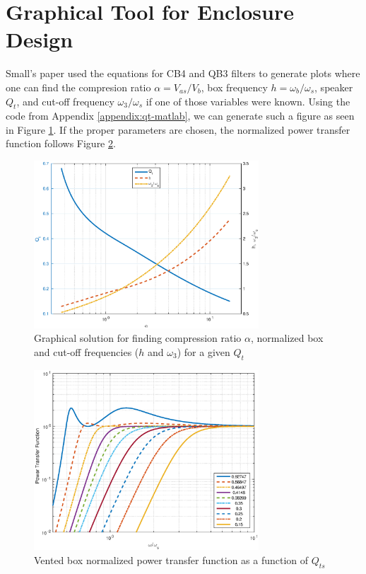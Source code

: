 \documentclass[10pt]{book}
\begin{document}
\section{Graphical Tool for Enclosure Design} Small's paper used the equations for CB4 and QB3 filters to generate plots where one can find the compresion ratio $\alpha=V_{as}/V_{b}$, box frequency $h=\omega_b/\omega_s$, speaker $Q_t$, and cut-off frequency $\omega_3/\omega_s$ if one of those variables were known. Using the code from Appendix \ref{appendix:qt-matlab}, we can generate such a figure as seen in Figure \ref{fig:qt-matlab}. If the proper parameters are chosen, the normalized power transfer function follows Figure \ref{fig:powertransfer-matlab}.


\begin{figure}
\centering
\includegraphics[width=0.75\textwidth]{matlab/vented_design.eps}
\caption{Graphical solution for finding compression ratio $\alpha$, normalized box and cut-off frequencies ($h$ and $\omega_3$) for a given $Q_t$}\label{fig:qt-matlab}
\end{figure}

\begin{figure}
\centering
\includegraphics[width=0.75\textwidth]{matlab/chebyfilters.eps}
\caption{Vented box normalized power transfer function as a function of $Q_{ts}$}\label{fig:powertransfer-matlab}
\end{figure}
\end{document}
